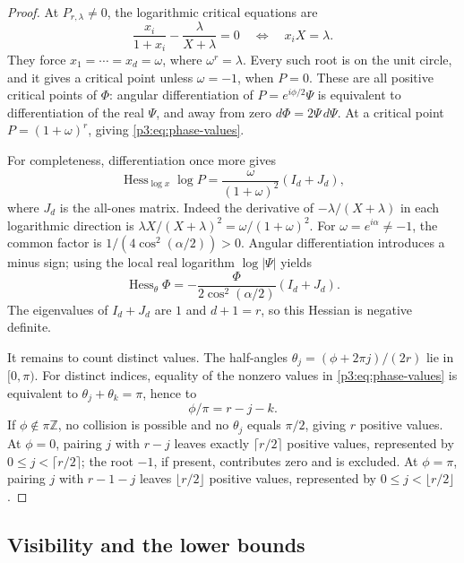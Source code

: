 \documentclass[11pt,a4paper]{article}
\theoremstyle{definition}
\theoremstyle{remark}
\numberwithin{equation}{section}
\begin{document}
\begin{proof}
At $P_{r,\lambda}\ne0$, the logarithmic critical equations are
\[
 \frac{x_i}{1+x_i}-\frac{\lambda}{X+\lambda}=0
 \quad\Longleftrightarrow\quad x_iX=\lambda.
\]
They force $x_1=\cdots=x_d=\omega$, where $\omega^r=\lambda$.
Every such root is on the unit circle, and it gives a critical point
unless $\omega=-1$, when $P=0$. These are all positive critical
points of $\Phi$: angular differentiation of $P=e^{i\phi/2}\Psi$
is equivalent to differentiation of the real $\Psi$, and away from
zero $d\Phi=2\Psi\,d\Psi$.
At a critical point $P=(1+\omega)^r$, giving
\eqref{p3:eq:phase-values}.

For completeness, differentiation once more gives
\[
 \operatorname{Hess}_{\log x}\log P
 =\frac{\omega}{(1+\omega)^2}(I_d+J_d),
\]
where $J_d$ is the all-ones matrix. Indeed the derivative of
$-\lambda/(X+\lambda)$ in each logarithmic direction is
$\lambda X/(X+\lambda)^2=\omega/(1+\omega)^2$.
For $\omega=e^{i\alpha}\ne-1$, the common factor is
$1/(4\cos^2(\alpha/2))>0$. Angular differentiation introduces a
minus sign; using the local real logarithm $\log|\Psi|$ yields
\begin{equation}\label{p3:eq:phase-hessian}
 \operatorname{Hess}_{\theta}\Phi
 =-\frac{\Phi}{2\cos^2(\alpha/2)}(I_d+J_d).
\end{equation}
The eigenvalues of $I_d+J_d$ are $1$ and $d+1=r$, so this Hessian
is negative definite.

It remains to count distinct values. The half-angles
$\theta_j=(\phi+2\pi j)/(2r)$ lie in $[0,\pi)$.
For distinct indices, equality of the nonzero values in
\eqref{p3:eq:phase-values} is equivalent to
$\theta_j+\theta_k=\pi$, hence to
\[
 \phi/\pi=r-j-k.
\]
If $\phi\notin\pi\mathbb Z$, no collision is possible and no
$\theta_j$ equals $\pi/2$, giving $r$ positive values.
At $\phi=0$, pairing $j$ with $r-j$ leaves exactly
$\lceil r/2\rceil$ positive values, represented by
$0\leq j<\lceil r/2\rceil$; the root $-1$, if present, contributes
zero and is excluded. At $\phi=\pi$, pairing $j$ with $r-1-j$
leaves $\lfloor r/2\rfloor$ positive values, represented by
$0\leq j<\lfloor r/2\rfloor$.
\end{proof}

\subsection{Visibility and the lower bounds}
\end{document}
